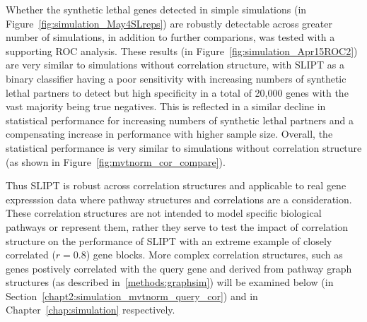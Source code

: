 Whether the synthetic lethal genes detected in simple simulations (in Figure~\ref{fig:simulation_May4SLreps}) are robustly detectable across greater number of simulations, in addition to further comparions, was tested with a supporting ROC analysis. These results (in Figure~\ref{fig:simulation_Apr15ROC2}) are very similar to simulations without correlation structure, with \gls{SLIPT} as a binary classifier having a poor sensitivity with increasing numbers of synthetic lethal partners to detect but high specificity in a total of 20,000 genes with the vast majority being true negatives. This is reflected in a similar decline in statistical performance for increasing numbers of synthetic lethal partners and a compensating increase in performance with higher sample size. Overall, the statistical performance is very similar to simulations without correlation structure (as shown in Figure~\ref{fig:mvtnorm_cor_compare}).

Thus \gls{SLIPT} is robust across correlation structures and applicable to real gene expresssion data where pathway structures and correlations are a consideration. These correlation structures are not intended to model specific biological pathways or represent them, rather they serve to test the impact of correlation structure on the performance of \gls{SLIPT} with an extreme example of closely correlated ($r = 0.8$) gene blocks. More complex correlation structures, such as genes postively correlated with the query gene and derived from pathway graph structures (as described in~\ref{methods:graphsim}) will be examined below (in Section~\ref{chapt2:simulation_mvtnorm_query_cor}) and in Chapter~\ref{chap:simulation} respectively.

